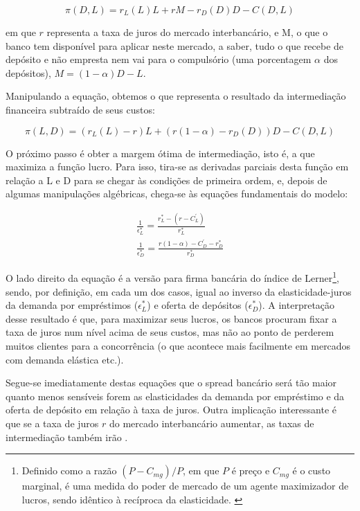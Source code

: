 \documentclass[a4paper,
               article,
               12pt,
               openany,
               oneside,
               english,
               brazil]{abntex2}
\numberwithin{equation}{section}
\begin{document}
    \begin{equation} \pi(D, L) = r_L(L)L + rM - r_D(D)D - C(D, L) \end{equation}
        
    em que $ r $ representa a taxa de juros do mercado interbancário, e M, o que o banco tem disponível para aplicar neste mercado, a saber, tudo o que recebe de depósito e não empresta nem vai para o compulsório (uma porcentagem $\alpha$ dos depósitos), $M = (1 - \alpha)D - L$. 

    Manipulando a equação, obtemos o que representa o resultado da intermediação financeira subtraído de seus custos: 
    
    \begin{equation} \pi(L, D) = (r_L(L) - r)L + (r(1 - \alpha) - r_D(D))D - C(D, L) \end{equation}

    O próximo passo é obter a margem ótima de intermediação, isto é, a que maximiza a função lucro. Para isso, tira-se as derivadas parciais desta função em relação a L e D para se chegar às condições de primeira ordem, e, depois de algumas manipulações algébricas, chega-se às equações fundamentais do modelo:

    \begin{gather}
        \frac{1}{\epsilon^{*}_L} = \frac{r^{*}_L - (r - C^{'}_L)}{r^{*}_L} \\
        \frac{1}{\epsilon^{*}_D} = \frac{r(1-\alpha)-C^{'}_D - r^{*}_D}{r^{*}_D}
    \end{gather}

    O lado direito da equação é a versão para firma bancária do índice de Lerner\footnote{Definido como a razão $(P - C_{mg}) / P$, em que $P$ é preço e $C_{mg}$ é o custo marginal, é uma medida do poder de mercado de um agente maximizador de lucros, sendo idêntico à recíproca da elasticidade. \cite{maudos}}, sendo, por definição, em cada um dos casos, igual ao inverso da elasticidade-juros da demanda por empréstimos ($\epsilon^{*}_L$) e oferta de depósitos ($\epsilon^{*}_D$). A interpretação desse resultado é que, para maximizar seus lucros, os bancos procuram fixar a taxa de juros num nível acima de seus custos, mas não ao ponto de perderem muitos clientes para a concorrência (o que acontece mais facilmente em mercados com demanda elástica etc.).

    Segue-se imediatamente destas equações que o spread bancário será tão maior quanto menos sensíveis forem as elasticidades da demanda por empréstimo e da oferta de depósito em relação à taxa de juros. Outra implicação interessante é que se a taxa de juros $ r $ do mercado interbancário aumentar, as taxas de intermediação também irão \cite[p.~59]{freixas}.
\end{document}
